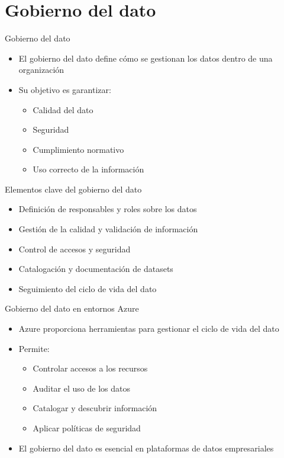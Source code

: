 \documentclass{beamer}
\begin{document}
\section{Gobierno del dato}

\begin{frame}{Gobierno del dato}
\begin{itemize}
    \item El gobierno del dato define cómo se gestionan los datos dentro de una organización
    \item Su objetivo es garantizar:
    \begin{itemize}
        \item Calidad del dato
        \item Seguridad
        \item Cumplimiento normativo
        \item Uso correcto de la información
    \end{itemize}
\end{itemize}
\end{frame}

\begin{frame}{Elementos clave del gobierno del dato}
\begin{itemize}
    \item Definición de responsables y roles sobre los datos
    \item Gestión de la calidad y validación de información
    \item Control de accesos y seguridad
    \item Catalogación y documentación de datasets
    \item Seguimiento del ciclo de vida del dato
\end{itemize}
\end{frame}

\begin{frame}{Gobierno del dato en entornos Azure}
\begin{itemize}
    \item Azure proporciona herramientas para gestionar el ciclo de vida del dato
    \item Permite:
    \begin{itemize}
        \item Controlar accesos a los recursos
        \item Auditar el uso de los datos
        \item Catalogar y descubrir información
        \item Aplicar políticas de seguridad
    \end{itemize}
    \item El gobierno del dato es esencial en plataformas de datos empresariales
\end{itemize}
\end{frame}
\end{document}
